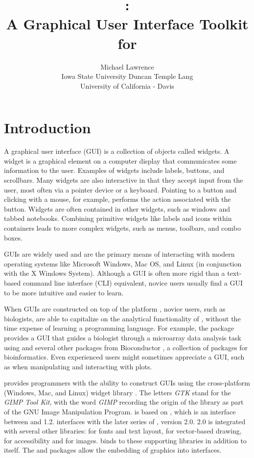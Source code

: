 \documentclass[article]{jss}
\author{Michael Lawrence\\
Iowa State University \And Duncan Temple Lang\\
University of California - Davis}
\title{\pkg{RGtk2}:\\A Graphical User Interface Toolkit for \proglang{R}}
\begin{document}
\section{Introduction}

A graphical user interface (GUI) is a collection of objects called
widgets. A widget is a graphical element on a computer display that
communicates some information to the user. Examples of widgets include
labels, buttons, and scrollbars. Many widgets are also interactive
in that they accept input from the user, most often via a pointer
device or a keyboard. Pointing to a button and clicking with a mouse,
for example, performs the action associated with the button. Widgets
are often contained in other widgets, such as windows and tabbed notebooks.
Combining primitive widgets like labels and icons within containers
leads to more complex widgets, such as menus, toolbars, and combo
boxes. 

GUIs are widely used and are the primary
means of interacting with modern operating systems like Microsoft
Windows, Mac OS, and Linux (in conjunction with the X Windows System).
Although a GUI is often more rigid than a text-based command line
interface (CLI) equivalent, novice users usually find a GUI to be
more intuitive and easier to learn.

When GUIs are constructed on top of the  platform \citep{R}, novice
users, such as biologists, are able to capitalize on the analytical functionality
of , without the time expense of learning a programming language. 
For example, the  package 
\citep{Limma} provides a GUI that guides a biologist through a microarray
data analysis task using  and several other  packages from Bioconductor
\citep{bioconductor}, a collection of  packages for bioinformatics.
Even experienced  users might sometimes appreciate a GUI, such as when
manipulating and interacting with plots.

 provides  programmers with the ability to construct GUIs using
the  cross-platform (Windows, Mac, and Linux) widget library \citep{GTK}.
The letters \emph{GTK} stand for the \emph{GIMP Tool Kit}, with the
word \emph{GIMP} recording the origin of the library as part of the
GNU Image Manipulation Program.  is based on , which is
an interface between  and  1.2.  interfaces 
with the later series of , version 2.0.  2.0 is 
integrated with several other libraries:  \citep{pango} 
for fonts and text layout,  \citep{cairo}
for vector-based drawing,  \citep{atk} for accessibility
and  \citep{gdkpixbuf} for images.  binds to these
supporting libraries in addition to  itself. 
The 
\citep{gtkDevice} and  \citep{cairoDevice} packages allow
the embedding of  graphics into  interfaces.
\end{document}
